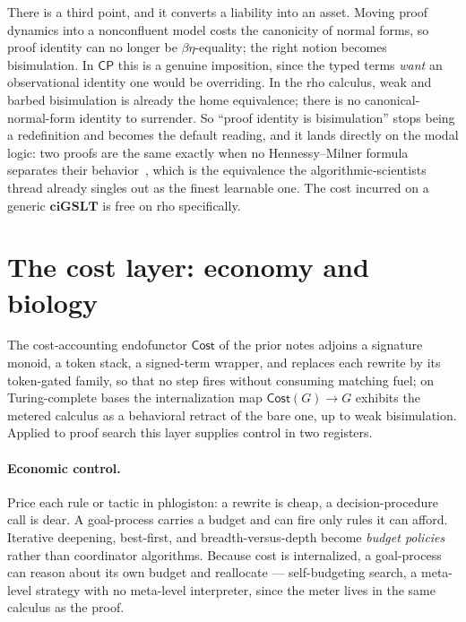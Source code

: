 \documentclass[11pt]{article}
\theoremstyle{plain}
\theoremstyle{definition}
\theoremstyle{remark}
\newcommand{\Cost}{\mathsf{Cost}}
\newcommand{\ciGSLT}{\mathbf{ciGSLT}}
\newcommand{\CP}{\textsf{CP}}
\begin{document}
There is a third point, and it converts a liability into an asset. Moving proof
dynamics into a nonconfluent model costs the canonicity of normal forms, so
proof identity can no longer be $\beta\eta$-equality; the right notion becomes
bisimulation. In $\CP$ this is a genuine imposition, since the typed terms
\emph{want} an observational identity one would be overriding. In the rho
calculus, weak and barbed bisimulation is already the home equivalence; there is
no canonical-normal-form identity to surrender. So ``proof identity is
bisimulation'' stops being a redefinition and becomes the default reading, and
it lands directly on the modal logic: two proofs are the same exactly when no
Hennessy--Milner formula separates their behavior~\cite{hennessymilner}, which
is the equivalence the algorithmic-scientists thread already singles out as the
finest learnable one. The cost incurred on a generic $\ciGSLT$ is free on rho
specifically.

\section{The cost layer: economy and biology}

The cost-accounting endofunctor $\Cost$ of the prior notes adjoins a signature
monoid, a token stack, a signed-term wrapper, and replaces each rewrite by its
token-gated family, so that no step fires without consuming matching fuel; on
Turing-complete bases the internalization map $\Cost(G)\to G$ exhibits the
metered calculus as a behavioral retract of the bare one, up to weak
bisimulation. Applied to proof search this layer supplies control in two
registers.

\paragraph{Economic control.} Price each rule or tactic in phlogiston: a rewrite
is cheap, a decision-procedure call is dear. A goal-process carries a budget and
can fire only rules it can afford. Iterative deepening, best-first, and
breadth-versus-depth become \emph{budget policies} rather than coordinator
algorithms. Because cost is internalized, a goal-process can reason about its own
budget and reallocate --- self-budgeting search, a meta-level strategy with no
meta-level interpreter, since the meter lives in the same calculus as the proof.
\end{document}
